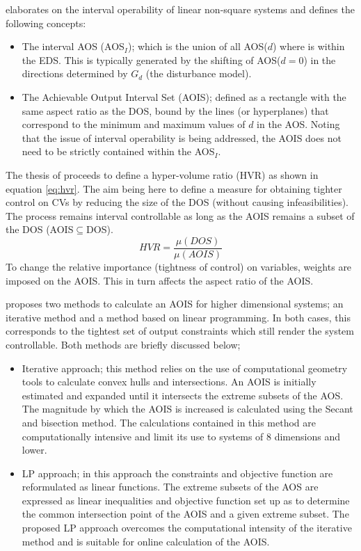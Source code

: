 \citet{limaphd} elaborates on the interval operability of linear non-square systems and defines the following concepts:
\begin{itemize}
  \item The interval AOS (AOS$_I$); which is the union of all AOS($d$) where is within the EDS. 
This is typically generated by the shifting of AOS($d=0$) in the directions determined by $G_d$ (the disturbance model).
  \item The Achievable Output Interval Set (AOIS); defined as a rectangle with the same aspect ratio as the DOS, bound by the lines (or hyperplanes) that correspond to the minimum and maximum values of $d$ in the AOS. 
Noting that the issue of interval operability is being addressed, the AOIS does not need to be strictly contained within the AOS$_I$.
\end{itemize}
The thesis of \citet{limaphd} proceeds to define a hyper-volume ratio (HVR) as shown in equation \ref{eq:hvr}. 
The aim being here to define a measure for obtaining tighter control on CVs by reducing the size of the DOS (without causing infeasibilities). 
The process remains interval controllable as long as the AOIS remains a subset of the DOS (AOIS$\subseteq$DOS).
\begin{equation}
  \label{eq:hvr}
    HVR = \frac{\mu(DOS)}{\mu(AOIS)}
\end{equation}
To change the relative importance (tightness of control) on variables, weights are imposed on the AOIS. 
This in turn affects the aspect ratio of the AOIS.

\citet{limaphd} proposes two methods to calculate an AOIS for higher dimensional systems; an iterative method and a method based on linear programming. 
In both cases, this corresponds to the tightest set of output constraints which still render the system controllable. 
Both methods are briefly discussed below;
\begin{itemize}
  \item Iterative approach; this method relies on the use of computational geometry tools to calculate convex hulls and intersections. 
An AOIS is initially estimated and expanded until it intersects the extreme subsets of the AOS. 
The magnitude by which the AOIS is increased is calculated using the Secant and bisection method. 
The calculations contained in this method are computationally intensive and limit its use to systems of 8 dimensions and lower.
  \item LP approach; in this approach the constraints and objective function are reformulated as linear functions. 
The extreme subsets of the AOS are expressed as linear inequalities and objective function set up as to determine the common intersection point of the AOIS and a given extreme subset. 
The proposed LP approach overcomes the computational intensity of the iterative method and is suitable for online calculation of the AOIS.
\end{itemize}

